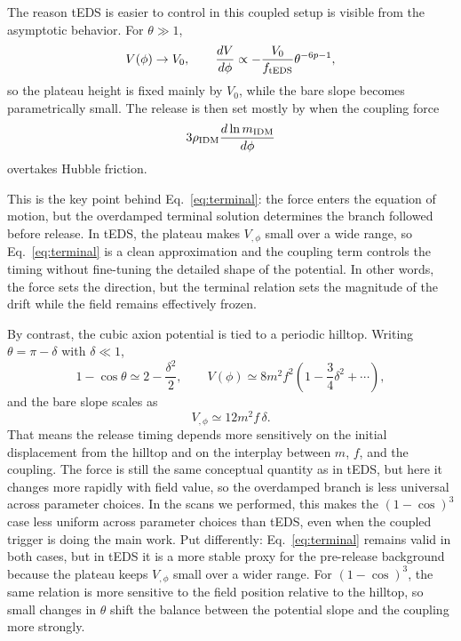 \documentclass[aps,onecolumn,prd,nofootinbib,superscriptaddress,10pt,longbibliography,floatfix]{revtex4-2}
\begin{document}
The reason tEDS is easier to control in this coupled setup is visible from the asymptotic behavior. For $\theta \gg 1$,
\begin{equation}
V(\phi)\to V_0,
\qquad
\frac{dV}{d\phi}\propto -\frac{V_0}{f_{\rm tEDS}}\theta^{-6p-1},
\end{equation}
so the plateau height is fixed mainly by $V_0$, while the bare slope becomes parametrically small. The release is then set mostly by when the coupling force
\begin{equation}
3\rho_{\rm IDM}\frac{d\ln m_{\rm IDM}}{d\phi}
\end{equation}
overtakes Hubble friction.

This is the key point behind Eq.~\eqref{eq:terminal}: the force enters the equation of motion, but the overdamped terminal solution determines the branch followed before release. In tEDS, the plateau makes $V_{,\phi}$ small over a wide range, so Eq.~\eqref{eq:terminal} is a clean approximation and the coupling term controls the timing without fine-tuning the detailed shape of the potential. In other words, the force sets the direction, but the terminal relation sets the magnitude of the drift while the field remains effectively frozen.

By contrast, the cubic axion potential is tied to a periodic hilltop. Writing $\theta=\pi-\delta$ with $\delta\ll1$,
\begin{equation}
1-\cos\theta \simeq 2-\frac{\delta^2}{2},
\qquad
V(\phi)\simeq 8m^2f^2\left(1-\frac{3}{4}\delta^2+\cdots\right),
\end{equation}
and the bare slope scales as
\begin{equation}
V_{,\phi}\simeq 12m^2f\,\delta.
\end{equation}
That means the release timing depends more sensitively on the initial displacement from the hilltop and on the interplay between $m$, $f$, and the coupling. The force is still the same conceptual quantity as in tEDS, but here it changes more rapidly with field value, so the overdamped branch is less universal across parameter choices. In the scans we performed, this makes the $(1-\cos)^3$ case less uniform across parameter choices than tEDS, even when the coupled trigger is doing the main work. Put differently: Eq.~\eqref{eq:terminal} remains valid in both cases, but in tEDS it is a more stable proxy for the pre-release background because the plateau keeps $V_{,\phi}$ small over a wider range. For $(1-\cos)^3$, the same relation is more sensitive to the field position relative to the hilltop, so small changes in $\theta$ shift the balance between the potential slope and the coupling more strongly.
\end{document}
